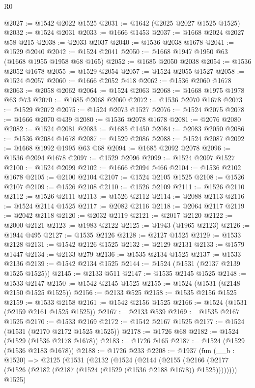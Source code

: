 \begin{lexlean}{R0}
\begin{coremodule}
@2027 := @1542 @2022 @1525
@2031 := @1642 (@2025 @2027 @1525 @1525)
@2032 := @1524 @2031
@2033 := @1666 @1453
@2037 := @1668 @2024 @2027 @58 @215
@2038 := @2033 @2037
@2040 := @1536 @2038 @1678
@2041 := @1529 @2040
@2042 := @1524 @2041
@2050 := @1668 @1947 @1950 @63 (@1668 @1955 @1958 @68 @165)
@2052 := @1685 @2050 @2038
@2054 := @1536 @2052 @1678
@2055 := @1529 @2054
@2057 := @1524 @2055 @1527
@2058 := @1524 @2057
@2060 := @1666 @2052 @418
@2062 := @1536 @2060 @1678
@2063 := @2058 @2062
@2064 := @1524 @2063
@2068 := @1668 @1975 @1978 @63 @73
@2070 := @1685 @2068 @2060
@2072 := @1536 @2070 @1678
@2073 := @1529 @2072
@2075 := @1524 @2073 @1527
@2076 := @1524 @2075
@2078 := @1666 @2070 @439
@2080 := @1536 @2078 @1678
@2081 := @2076 @2080
@2082 := @1524 @2081
@2083 := @1685 @1450
@2084 := @2083 @2050
@2086 := @1536 @2084 @1678
@2087 := @1529 @2086
@2088 := @1524 @2087
@2092 := @1668 @1992 @1995 @63 @68
@2094 := @1685 @2092 @2078
@2096 := @1536 @2094 @1678
@2097 := @1529 @2096
@2099 := @1524 @2097 @1527
@2100 := @1524 @2099
@2102 := @1666 @2094 @466
@2104 := @1536 @2102 @1678
@2105 := @2100 @2104
@2107 := @1524 @2105 @1525
@2108 := @1526 @2107
@2109 := @1526 @2108
@2110 := @1526 @2109
@2111 := @1526 @2110
@2112 := @1526 @2111
@2113 := @1526 @2112
@2114 := @2088 @2113
@2116 := @1524 @2114 @1525
@2117 := @2082 @2116
@2118 := @2064 @2117
@2119 := @2042 @2118
@2120 := @2032 @2119
@2121 := @2017 @2120
@2122 := @2000 @2121
@2123 := @1983 @2122
@2125 := @1943 (@1965 @2123)
@2126 := @1944 @495
@2127 := @1535 @2126
@2128 := @2127 @1525
@2129 := @1533 @2128
@2131 := @1542 @2126 @1525
@2132 := @2129 @2131
@2133 := @1579 @1447
@2134 := @2133 @279
@2136 := @1535 @2134 @1525
@2137 := @1533 @2136
@2139 := @1542 @2134 @1525
@2144 := @1524 (@1531 (@2137 @2139 @1525 @1525))
@2145 := @2133 @511
@2147 := @1535 @2145 @1525
@2148 := @1533 @2147
@2150 := @1542 @2145 @1525
@2155 := @1524 (@1531 (@2148 @2150 @1525 @1525))
@2156 := @2133 @525
@2158 := @1535 @2156 @1525
@2159 := @1533 @2158
@2161 := @1542 @2156 @1525
@2166 := @1524 (@1531 (@2159 @2161 @1525 @1525))
@2167 := @2133 @539
@2169 := @1535 @2167 @1525
@2170 := @1533 @2169
@2172 := @1542 @2167 @1525
@2177 := @1524 (@1531 (@2170 @2172 @1525 @1525))
@2178 := @1726 @68
@2182 := @1524 (@1529 (@1536 @2178 @1678))
@2183 := @1726 @165
@2187 := @1524 (@1529 (@1536 @2183 @1678))
@2188 := @1726 @233
@2208 := @1937
    (fun (__b : @1520) =>
    @2125
      (@1531
        (@2132
          (@1524
            (@2144
              (@2155
                (@2166 (@2177 (@1526 (@2182 (@2187 (@1524 (@1529 (@1536 @2188 @1678)) @1525))))))))
            @1525)

\end{coremodule}
\end{lexlean}
